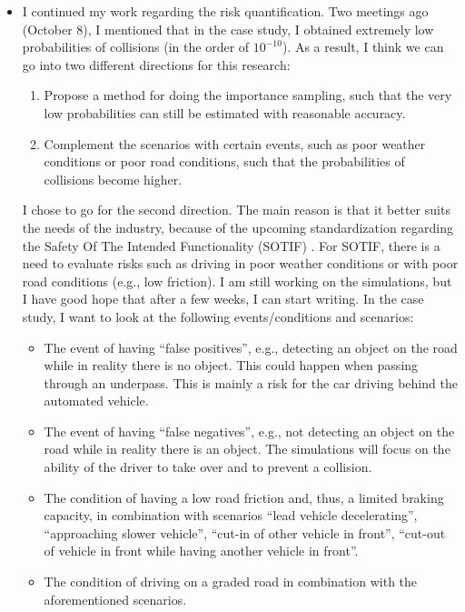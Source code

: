 \documentclass[10pt,final,a4paper,oneside,onecolumn]{article}
\begin{document}
\begin{itemize}
	 \item I continued my work regarding the risk quantification. 
	 Two meetings ago (October 8), I mentioned that in the case study, I obtained extremely low probabilities of collisions (in the order of $10^{-10}$). 
	 As a result, I think we can go into two different directions for this research:
	 \begin{enumerate}
		 \item Propose a method for doing the importance sampling, such that the very low probabilities can still be estimated with reasonable accuracy.
		 \item Complement the scenarios with certain events, such as poor weather conditions or poor road conditions, such that the probabilities of collisions become higher.
	 \end{enumerate}
	 I chose to go for the second direction.
	 The main reason is that it better suits the needs of the industry, because of the upcoming standardization regarding the Safety Of The Intended Functionality (SOTIF) \cite{ISO21448}.
	 For SOTIF, there is a need to evaluate risks such as driving in poor weather conditions or with poor road conditions (e.g., low friction).
	 I am still working on the simulations, but I have good hope that after a few weeks, I can start writing.
	 In the case study, I want to look at the following events/conditions and scenarios:
	 \begin{itemize}
		 \item The event of having ``false positives'', e.g., detecting an object on the road while in reality there is no object. This could happen when passing through an underpass. This is mainly a risk for the car driving behind the automated vehicle.
		 \item The event of having ``false negatives'', e.g., not detecting an object on the road while in reality there is an object. The simulations will focus on the ability of the driver to take over and to prevent a collision.
		 \item The condition of having a low road friction and, thus, a limited braking capacity, in combination with scenarios ``lead vehicle decelerating'', ``approaching slower vehicle'', ``cut-in of other vehicle in front'', ``cut-out of vehicle in front while having another vehicle in front''.
		 \item The condition of driving on a graded road in combination with the aforementioned scenarios.
	 \end{itemize}
	 

\end{itemize}
\end{document}
